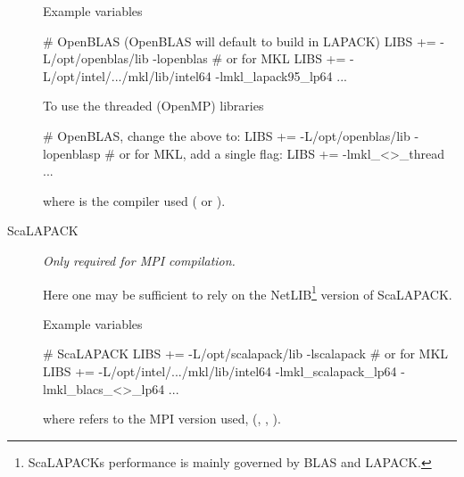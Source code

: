 \begin{description}
  Example variables
\begin{shellexample}
  # OpenBLAS (OpenBLAS will default to build in LAPACK)
  LIBS += -L/opt/openblas/lib -lopenblas
  # or for MKL
  LIBS += -L/opt/intel/.../mkl/lib/intel64 -lmkl_lapack95_lp64 ...
\end{shellexample}

  To use the threaded (OpenMP) libraries
\begin{shellexample}
  # OpenBLAS, change the above to:
  LIBS += -L/opt/openblas/lib -lopenblasp
  # or for MKL, add a single flag:
  LIBS += -lmkl_<>_thread ...
\end{shellexample}
  where \shell{<>} is the compiler used ( or ).


  \item[ScaLAPACK]%
  \emph{Only required for MPI compilation.}

  Here one may be sufficient to rely on the NetLIB\footnote{ScaLAPACKs
      performance is mainly governed by BLAS and LAPACK.} version of
  ScaLAPACK. 

  Example variables
\begin{shellexample}
  # ScaLAPACK
  LIBS += -L/opt/scalapack/lib -lscalapack
  # or for MKL
  LIBS += -L/opt/intel/.../mkl/lib/intel64 -lmkl_scalapack_lp64 
           -lmkl_blacs_<>_lp64 ...
\end{shellexample}
where \shell{<>} refers to the MPI version used, (,
, ).

\end{description}

